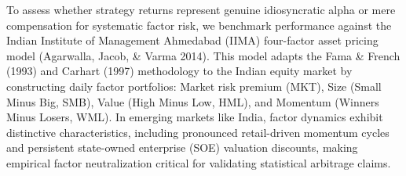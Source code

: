 To assess whether strategy returns represent genuine idiosyncratic alpha or mere compensation for systematic factor risk, we benchmark performance against the Indian Institute of Management Ahmedabad (IIMA) four-factor asset pricing model (Agarwalla, Jacob, \& Varma 2014). This model adapts the Fama \& French (1993) and Carhart (1997) methodology to the Indian equity market by constructing daily factor portfolios: Market risk premium (MKT), Size (Small Minus Big, SMB), Value (High Minus Low, HML), and Momentum (Winners Minus Losers, WML). In emerging markets like India, factor dynamics exhibit distinctive characteristics, including pronounced retail-driven momentum cycles and persistent state-owned enterprise (SOE) valuation discounts, making empirical factor neutralization critical for validating statistical arbitrage claims.

